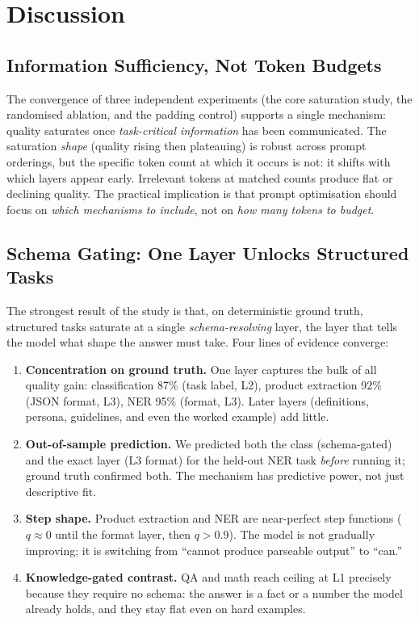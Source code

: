 \section{Discussion}
\label{sec:discussion}

\subsection{Information Sufficiency, Not Token Budgets}

The convergence of three independent experiments (the core saturation study,
the randomised ablation, and the padding control) supports a single
mechanism: quality saturates once \emph{task-critical information} has been
communicated.
The saturation \emph{shape} (quality rising then plateauing) is robust across
prompt orderings, but the specific token count at which it occurs is not: it
shifts with which layers appear early.
Irrelevant tokens at matched counts produce flat or declining quality.
The practical implication is that prompt optimisation should focus on
\emph{which mechanisms to include}, not on \emph{how many tokens to budget}.

\subsection{Schema Gating: One Layer Unlocks Structured Tasks}

The strongest result of the study is that, on deterministic ground truth,
structured tasks saturate at a single \emph{schema-resolving} layer, the layer
that tells the model what shape the answer must take.
Four lines of evidence converge:

\begin{enumerate}
  \item \textbf{Concentration on ground truth.} One layer captures the bulk of
    all quality gain: classification 87\% (task label, L2), product extraction
    92\% (JSON format, L3), NER 95\% (format, L3). Later layers (definitions,
    persona, guidelines, and even the worked example) add little.
  \item \textbf{Out-of-sample prediction.} We predicted both the class
    (schema-gated) and the exact layer (L3 format) for the held-out NER task
    \emph{before} running it; ground truth confirmed both. The mechanism has
    predictive power, not just descriptive fit.
  \item \textbf{Step shape.} Product extraction and NER are near-perfect step
    functions ($q \approx 0$ until the format layer, then $q > 0.9$). The
    model is not gradually improving; it is switching from ``cannot produce
    parseable output'' to ``can.''
  \item \textbf{Knowledge-gated contrast.} QA and math reach ceiling at L1
    precisely because they require no schema: the answer is a fact or a number
    the model already holds, and they stay flat even on hard examples.
\end{enumerate}

